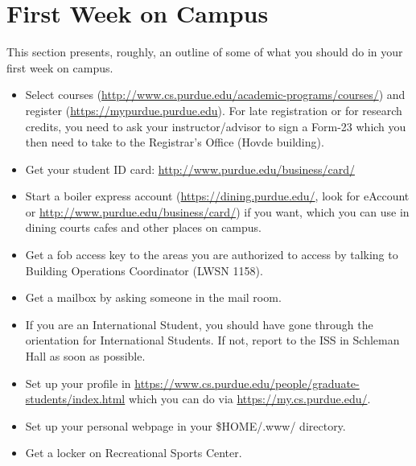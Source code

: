 \section{First Week on Campus}

This section presents, roughly, an outline of some of what you should do in your first week on campus.

\begin{itemize}
	\item Select courses (\url{http://www.cs.purdue.edu/academic-programs/courses/}) and register (\url{https://mypurdue.purdue.edu}). For late registration or for research credits, you need to ask your instructor/advisor to sign a Form-23 which you then need to take to the Registrar's Office (Hovde building).

	\item Get your student ID card: \url{http://www.purdue.edu/business/card/}

	\item Start a boiler express account (\url{https://dining.purdue.edu/}, look for eAccount or \url{http://www.purdue.edu/business/card/}) if you want, which you can use in dining courts cafes and other places on campus.

	\item Get a fob access key to the areas you are authorized to access by talking to Building Operations Coordinator (LWSN 1158).

	\item Get a mailbox by asking someone in the mail room.

	\item If you are an International Student, you should have gone through the orientation for International Students. If not, report to the ISS in Schleman Hall as soon as possible.

	\item Set up your profile in \url{https://www.cs.purdue.edu/people/graduate-students/index.html} which you can do via \url{https://my.cs.purdue.edu/}.

	\item Set up your personal webpage in your \$HOME/.www/ directory.

	\item Get a locker on Recreational Sports Center.

\end{itemize}

